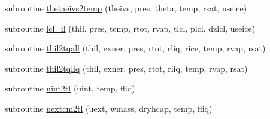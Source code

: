 \begin{DoxyCompactItemize}
\item 
subroutine \hyperlink{namespacetherm__lib_a8067ee37cd0529f1940178817b175cbc}{thetaeivs2temp} (theivs, pres, theta, temp, rsat, useice)
\item 
subroutine \hyperlink{namespacetherm__lib_a0b1c333335dfb4af1c56bc56a0e45440}{lcl\+\_\+il} (thil, pres, temp, rtot, rvap, tlcl, plcl, dzlcl, useice)
\item 
subroutine \hyperlink{namespacetherm__lib_a8fda8004633d91addcf1c6004df3bd88}{thil2tqall} (thil, exner, pres, rtot, rliq, rice, temp, rvap, rsat)
\item 
subroutine \hyperlink{namespacetherm__lib_a0285be7469fbc289302f23bd321fce36}{thil2tqliq} (thil, exner, pres, rtot, rliq, temp, rvap, rsat)
\item 
subroutine \hyperlink{namespacetherm__lib_a6ded17767672913967afa919fef33015}{uint2tl} (uint, temp, fliq)
\item 
subroutine \hyperlink{namespacetherm__lib_ac588ab0dc1c0c52c4c41b847be134ee9}{uextcm2tl} (uext, wmass, dryhcap, temp, fliq)
\end{DoxyCompactItemize}

